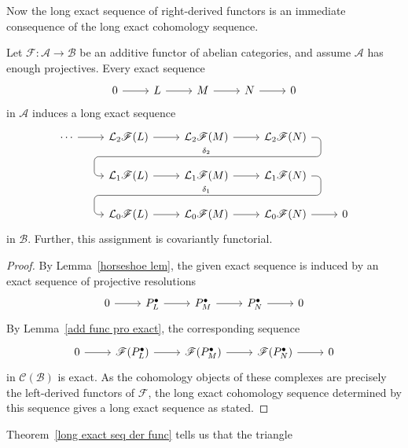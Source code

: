 Now the long exact sequence of right-derived functors is an immediate consequence of the long exact cohomology sequence.
\begin{theorem}\label{long exact seq der func}
Let $\mathscr{F}:\mathcal{A}\to\mathcal{B}$ be an additive functor of abelian categories, and assume $\mathcal{A}$ has enough projectives. Every exact sequence
\[\begin{tikzcd}
0\ar[r]&L\ar[r]&M\ar[r]&N\ar[r]&0
\end{tikzcd}\]
in $\mathcal{A}$ induces a long exact sequence
\[\begin{tikzcd}
\cdots\ar[r]&\mathcal{L}_2\mathscr{F}(L)\ar[r] &\mathcal{L}_2\mathscr{F}(M)\rar
\ar[draw=none]{d}[name=X, anchor=center]{}
&\mathcal{L}_2\mathscr{F}(N)\ar[rounded corners,swap,
to path={ -- ([xshift=2ex]\tikztostart.east)
	|- (X.center) \tikztonodes
	-| ([xshift=-2ex]\tikztotarget.west)
	-- (\tikztotarget)}]{dll}[at end]{\delta_2}&\\      
&\mathcal{L}_1\mathscr{F}(L)\rar &\mathcal{L}_1\mathscr{F}(M)\ar[draw=none]{d}[name=Y, anchor=center]{}\rar &\mathcal{L}_1\mathscr{F}(N)\ar[rounded corners,swap,
to path={ -- ([xshift=2ex]\tikztostart.east)
	|- (Y.center) \tikztonodes
	-| ([xshift=-2ex]\tikztotarget.west)
	-- (\tikztotarget)}]{dll}[at end]{\delta_1}&\\
&\mathcal{L}_0\mathscr{F}(L)\rar &\mathcal{L}_0\mathscr{F}(M)\rar &\mathcal{L}_0\mathscr{F}(N)\ar[r]&0
\end{tikzcd}\]
in $\mathcal{B}$. Further, this assignment is covariantly functorial.
\end{theorem}
\begin{proof}
By Lemma~\ref{horseshoe lem}, the given exact sequence is induced by an exact sequence of projective resolutions
\[\begin{tikzcd}
0\ar[r]&P^\bullet_L\ar[r]&P^\bullet_M\ar[r]&P^\bullet_N\ar[r]&0
\end{tikzcd}\]
By Lemma~\ref{add func pro exact}, the corresponding sequence
\[\begin{tikzcd}
0\ar[r]&\mathscr{F}(P^\bullet_L)\ar[r]&\mathscr{F}(P^\bullet_M)\ar[r]&\mathscr{F}(P^\bullet_N)\ar[r]&0
\end{tikzcd}\]
in $\mathcal{C}(\mathcal{B})$ is exact. As the cohomology objects of these complexes are precisely the left-derived functors of $\mathscr{F}$, the long exact cohomology sequence determined by this
sequence gives a long exact sequence as stated.
\end{proof}
Theorem~\ref{long exact seq der func} tells us that the triangle
